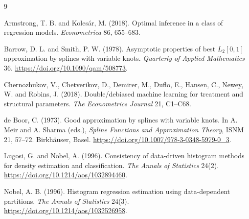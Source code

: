 \documentclass[11pt]{article}
\theoremstyle{plain}
\theoremstyle{definition}
\theoremstyle{remark}
\begin{document}
\begin{thebibliography}{9}

 Armstrong, T. B. and
  Kolesár, M. (2018). Optimal inference in a class of regression models.
  \emph{Econometrica} 86, 655--683.

 Barrow, D. L. and Smith,
  P. W. (1978). Asymptotic properties of best $L_2[0,1]$ approximation by
  splines with variable knots. \emph{Quarterly of Applied Mathematics} 36.
  \url{https://doi.org/10.1090/qam/508773}.

 Chernozhukov, V.,
  Chetverikov, D., Demirer, M., Duflo, E., Hansen, C., Newey, W. and Robins,
  J. (2018). Double/debiased machine learning for treatment and structural
  parameters. \emph{The Econometrics Journal} 21, C1--C68.

 de Boor, C. (1973). Good approximation
  by splines with variable knots. In A. Meir and A. Sharma (eds.),
  \emph{Spline Functions and Approximation Theory}, ISNM 21, 57--72.
  Birkh\"auser, Basel. \url{https://doi.org/10.1007/978-3-0348-5979-0_3}.

 Lugosi, G. and Nobel, A.
  (1996). Consistency of data-driven histogram methods for density
  estimation and classification. \emph{The Annals of Statistics} 24(2).
  \url{https://doi.org/10.1214/aos/1032894460}.

 Nobel, A. B. (1996). Histogram regression
  estimation using data-dependent partitions. \emph{The Annals of
  Statistics} 24(3). \url{https://doi.org/10.1214/aos/1032526958}.

\end{thebibliography}
\end{document}
